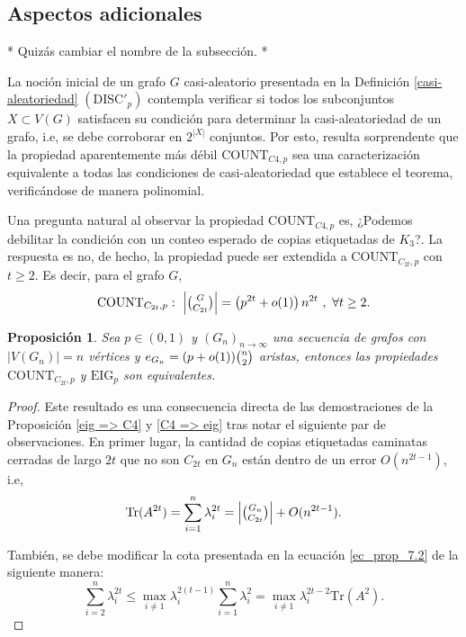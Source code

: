 \documentclass{article}[14pts]
\newcommand{\hh}[1]{{\color{red} * #1 *}}
\newtheorem{prop}{Proposición}
\newcommand{\discp}{\mathrm{DISC'}}
\newcommand{\Count}{\mathrm{COUNT}}
\newcommand{\eig}{\mathrm{EIG}}
\newcommand{\Tr}{\mathrm{Tr}}
\begin{document}
\subsection{Aspectos adicionales} \hh{Quizás cambiar el nombre de la subsección.}\medskip

La noción inicial de un grafo $G$ casi-aleatorio presentada en la Definición \ref{casi-aleatoriedad} $(\discp_p)$ contempla verificar si todos los subconjuntos $X\subset V(G)$ satisfacen su condición para determinar la casi-aleatoriedad de un grafo, i.e, se debe corroborar en $2^{|X|}$ conjuntos. Por esto, resulta sorprendente que la propiedad aparentemente más débil $\Count_{C4,p}$ sea una caracterización equivalente a todas las condiciones de casi-aleatoriedad que establece el teorema, verificándose de manera polinomial.\medskip

Una pregunta natural al observar la propiedad $\Count_{C4,p}$ es, ¿Podemos debilitar la condición con un conteo esperado de copias etiquetadas de $K_3$?. La respuesta es no, de hecho, la propiedad puede ser extendida a $\Count_{C_{2t},p}$ con $t\geq 2$. Es decir, para el grafo $G$,
\[
    \Count_{C_{2t},p} :\ \left| \tbinom{G}{C_{2t}}\right| = \left( p^{2t} + o(1)\right)n^{2t}\ ,\ \forall t\geq 2.
\]

\begin{prop}
    Sea $p\in (0,1)$ y $(G_n)_{n\to\infty}$ una secuencia de grafos con $|V(G_n)| = n$ vértices y $e_{G_n} = (p + o(1))\tbinom{n}{2}$ aristas, entonces las propiedades $\Count_{C_{2t},p}$ y $\eig_p$ son equivalentes.
\end{prop}

\begin{proof}
    Este resultado es una consecuencia directa de las demostraciones de la Proposición \ref{eig => C4} y \ref{C4 => eig} tras notar el siguiente par de observaciones. En primer lugar, la cantidad de copias etiquetadas caminatas cerradas de largo $2t$ que no son $C_{2t}$ en $G_n$ están dentro de un error $O(n^{2t - 1})$, i.e,
    \[
        \Tr(A^{2t}) = \sum_{i=1}^{n} \lambda_{i}^{2t} = \left| \tbinom{G_n}{C_{2t}}\right| + O(n^{2t -1}).
    \]

    También, se debe modificar la cota presentada en la ecuación \eqref{ec_prop_7.2} de la siguiente manera:
    \[
        \sum_{i=2}^{n}\lambda_{i}^{2t} \leq \max_{i\not=1}\lambda_{i}^{2(t-1)}\sum_{i=1}^{n} \lambda_{i}^{2} = \max_{i\not=1}\lambda_{i}^{2t-2} \Tr(A^{2}).
    \]
\end{proof}\medskip
\end{document}
